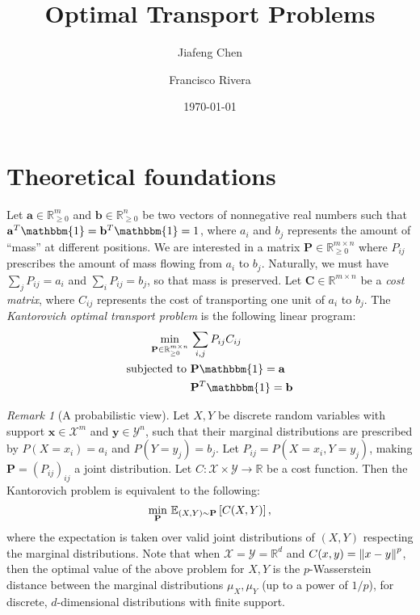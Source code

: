 \documentclass[11pt]{amsart}
\title{Optimal Transport Problems}
\author{Jiafeng Chen\and Francisco Rivera}
\date{\today}
\renewcommand{\b}{\mathbf}
\newcommand{\R}{\mathbb{R}}
\newcommand{\one}{\mathbbm{1}}
\newcommand{\E}{\mathbb{E}}
\theoremstyle{remark}
\newtheorem{rmk}{Remark}
\begin{document}
    \maketitle
    \section{Theoretical foundations} 
    Let $\b a \in \R^m_{\ge 0}$ and $\b b \in \R^n_{\ge 0}$ be two vectors of
    nonnegative real numbers such that $\b a^T \one = \b b^T \one = 1$, where
    $a_i$ and $b_j$ represents the amount of ``mass'' at different positions. 
    We are
    interested in a matrix $\b P \in \R^{m \times n}_{\ge 0}$ where $P_{ij}$
    prescribes
    the amount of mass flowing from $a_i$ to $b_j$. Naturally, we must have
    $\sum_j P_{ij} = a_i$ and $\sum_i P_{ij} = b_j$, so that mass is preserved.
    Let $\b C
    \in \R^{m\times n}$ be a \emph{cost matrix}, where $C_{ij}$ represents the
    cost of transporting one unit of $a_i$ to $b_j$. The \emph{Kantorovich
    optimal transport problem} is the following linear program: \begin{align*}
    \min_{\b P \in  \R^{m \times n}_{\ge 0}} \, & \sum_{i,j} P_{ij} C_{ij} \\
    \text{subjected to } & \b P \one = \b a \\
    & \b P^T \one = \b b
    \end{align*}
    
    \begin{rmk}[A probabilistic view]
    Let $X,Y$ be discrete random variables with support $\b
    x \in \mathcal X^m$ and $\b y \in \mathcal Y^n$, such that their marginal
    distributions are
    prescribed by $P(X = x_i) = a_i$ and $P(Y =
    y_j) = b_j$. Let $P_{ij} = P(X = x_i, Y = y_j)$, making $\b P = (P_{ij})_
    {ij}$ a joint
    distribution. Let $C: \mathcal X \times \mathcal Y \to \R$ be a cost
    function. Then the
    Kantorovich problem is equivalent to the following:\[
    \min_{\b P}\, \E_{(X,Y) \sim \b P}\bk{C(X,Y)},
    \]
    where the expectation is taken over valid joint distributions of $(X,Y)$
    respecting the marginal distributions. Note that when $\mathcal X = \mathcal
    Y = \R^d$ and $C(x,y) = \left\lVert x-y\right\rVert^p$, then the optimal value of the above
    problem for $X,Y$ is the $p$-Wasserstein distance between the marginal
    distributions $\mu_X,\mu_Y$ (up to a power of $1/p$), for discrete,
    $d$-dimensional distributions with finite support.
    \end{rmk}
    
\end{document}
